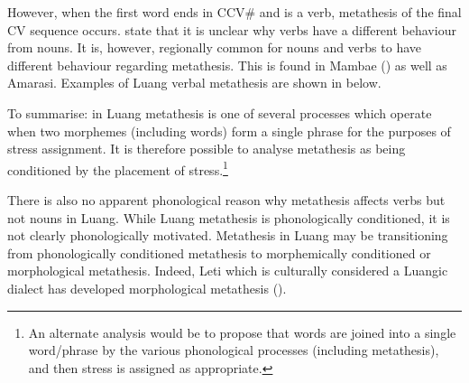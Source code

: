 \begin{exe}
	\label{ex:LuaVowDelEpe}
\end{exe}

However, when the first word ends in CCV{\#} and is a verb,
metathesis of the final CV sequence occurs.
\cite{tata15} state that it is unclear why verbs
have a different behaviour from nouns.
It is, however, regionally common for nouns and verbs to have different
behaviour regarding metathesis.
This is found in Mambae () as well as Amarasi.
Examples of Luang verbal metathesis are shown in  below.

\begin{exe}
	\label{ex:LuaMet}
\end{exe}

To summarise: in Luang metathesis is one of several processes
which operate when two morphemes (including words) form a single phrase
for the purposes of stress assignment.
It is therefore possible to analyse metathesis as being conditioned by the placement of stress.\footnote{
		An alternate analysis would be to propose that words are joined
		into a single word/phrase by the various
		phonological processes (including metathesis),
		and then stress is assigned as appropriate.}

There is also no apparent phonological reason why metathesis affects verbs but not nouns in Luang.
While Luang metathesis is phonologically conditioned,
it is not clearly phonologically motivated.
Metathesis in Luang may be transitioning from phonologically conditioned metathesis
to morphemically conditioned or morphological metathesis.
Indeed, Leti which is culturally considered a Luangic dialect
has developed morphological metathesis ().